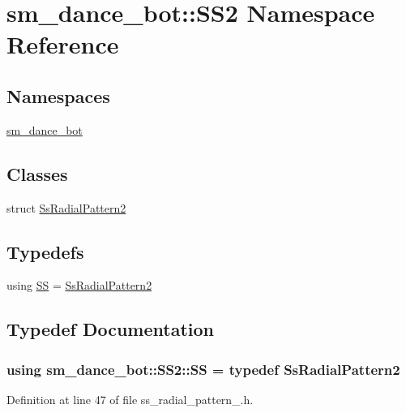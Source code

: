 \hypertarget{namespacesm__dance__bot_1_1SS2}{}\section{sm\+\_\+dance\+\_\+bot\+:\+:S\+S2 Namespace Reference}
\label{namespacesm__dance__bot_1_1SS2}
\subsection*{Namespaces}
\begin{DoxyCompactItemize}
\item 
 \hyperlink{namespacesm__dance__bot_1_1SS2_1_1sm__dance__bot}{sm\+\_\+dance\+\_\+bot}
\end{DoxyCompactItemize}
\subsection*{Classes}
\begin{DoxyCompactItemize}
\item 
struct \hyperlink{structsm__dance__bot_1_1SS2_1_1SsRadialPattern2}{Ss\+Radial\+Pattern2}
\end{DoxyCompactItemize}
\subsection*{Typedefs}
\begin{DoxyCompactItemize}
\item 
using \hyperlink{namespacesm__dance__bot_1_1SS2_a3af437d3b5fb32a00b12e171154d9165}{SS} = \hyperlink{structsm__dance__bot_1_1SS2_1_1SsRadialPattern2}{Ss\+Radial\+Pattern2}
\end{DoxyCompactItemize}


\subsection{Typedef Documentation}
\subsubsection[{\texorpdfstring{SS}{SS}}]{\setlength{\rightskip}{0pt plus 5cm}using {\bf sm\+\_\+dance\+\_\+bot\+::\+S\+S2\+::\+SS} = typedef {\bf Ss\+Radial\+Pattern2}}\hypertarget{namespacesm__dance__bot_1_1SS2_a3af437d3b5fb32a00b12e171154d9165}{}\label{namespacesm__dance__bot_1_1SS2_a3af437d3b5fb32a00b12e171154d9165}


Definition at line 47 of file ss\+\_\+radial\+\_\+pattern\+\_.\+h.

